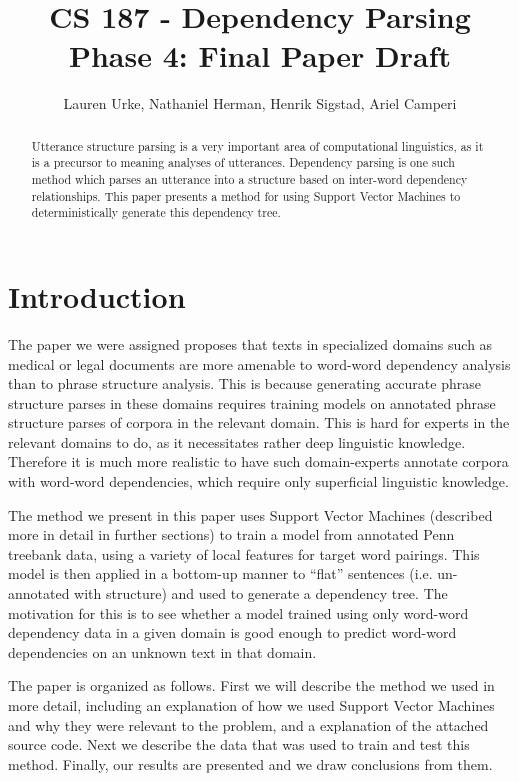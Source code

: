 \documentclass[12pt,fleqn]{amsart}
\title{CS 187 - Dependency Parsing\\Phase 4: Final Paper Draft}
\author{Lauren Urke, Nathaniel Herman, Henrik Sigstad, Ariel Camperi}
\date{}
\begin{document}
    \begin{abstract}
    Utterance structure parsing is a very important area of computational linguistics, as it is a precursor to meaning analyses of utterances. Dependency parsing is one such method which parses an utterance into a structure based on inter-word dependency relationships. This paper presents a method for using Support Vector Machines to deterministically generate this dependency tree.
    \end{abstract}

    \maketitle

\section{Introduction}
The paper we were assigned \cite{original-paper} proposes that texts in specialized domains such as medical or legal documents are more amenable to word-word dependency analysis than to phrase structure analysis. This is because generating accurate phrase structure parses in these domains requires training models on annotated phrase structure parses of corpora in the relevant domain. This is hard for experts in the relevant domains to do, as it necessitates rather deep linguistic knowledge. Therefore it is much more realistic to have such domain-experts annotate corpora with word-word dependencies, which require only superficial linguistic knowledge.

The method we present in this paper uses Support Vector Machines (described more in detail in further sections) to train a model from annotated Penn treebank data, using a variety of local features for target word pairings. This model is then applied in a bottom-up manner to ``flat'' sentences (i.e. un-annotated with structure) and used to generate a dependency tree. The motivation for this is to see whether a model trained using only word-word dependency data in a given domain is good enough to predict word-word dependencies on an unknown text in that domain.

The paper is organized as follows. First we will describe the method we used in more detail, including an explanation of how we used Support Vector Machines and why they were relevant to the problem, and a explanation of the attached source code. Next we describe the data that was used to train and test this method. Finally, our results are presented and we draw conclusions from them.
\end{document}
